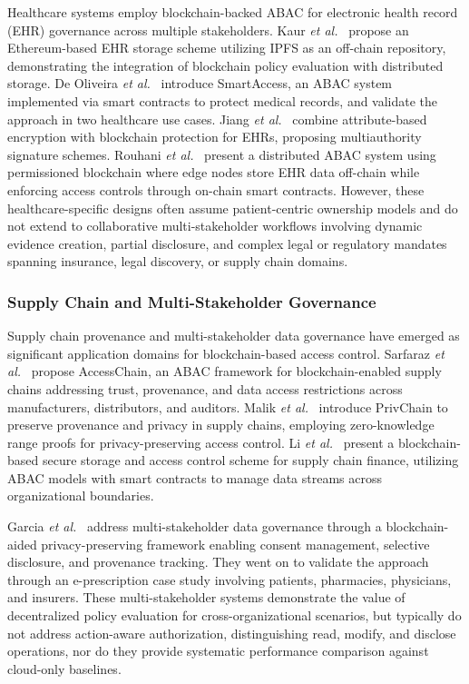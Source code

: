 \documentclass[pdflatex,sn-mathphys-num]{sn-jnl}
\begin{document}
Healthcare systems employ blockchain-backed ABAC for electronic health record (EHR) governance across multiple stakeholders. Kaur \emph{et al.}~\cite{kaur2024ehrabac} propose an Ethereum-based EHR storage scheme utilizing IPFS as an off-chain repository, demonstrating the integration of blockchain policy evaluation with distributed storage. De Oliveira \emph{et al.}~\cite{oliveira2022smartaccess} introduce SmartAccess, an ABAC system implemented via smart contracts to protect medical records, and validate the approach in two healthcare use cases. Jiang \emph{et al.}~\cite{jiang2022abeblockchain} combine attribute-based encryption with blockchain protection for EHRs, proposing multiauthority signature schemes. Rouhani \emph{et al.}~\cite{rouhani2021distributed} present a distributed ABAC system using permissioned blockchain where edge nodes store EHR data off-chain while enforcing access controls through on-chain smart contracts. However, these healthcare-specific designs often assume patient-centric ownership models and do not extend to collaborative multi-stakeholder workflows involving dynamic evidence creation, partial disclosure, and complex legal or regulatory mandates spanning insurance, legal discovery, or supply chain domains.

\subsubsection{Supply Chain and Multi-Stakeholder Governance}
Supply chain provenance and multi-stakeholder data governance have emerged as significant application domains for blockchain-based access control. Sarfaraz \emph{et al.}~\cite{sarfaraz2023accesschain} propose AccessChain, an ABAC framework for blockchain-enabled supply chains addressing trust, provenance, and data access restrictions across manufacturers, distributors, and auditors. Malik \emph{et al.}~\cite{malik2022privchain} introduce PrivChain to preserve provenance and privacy in supply chains, employing zero-knowledge range proofs for privacy-preserving access control. Li \emph{et al.}~\cite{li2022blockchainsupply} present a blockchain-based secure storage and access control scheme for supply chain finance, utilizing ABAC models with smart contracts to manage data streams across organizational boundaries.

Garcia \emph{et al.}~\cite{garcia2022blockchainmulti} address multi-stakeholder data governance through a blockchain-aided privacy-preserving framework enabling consent management, selective disclosure, and provenance tracking. They went on to validate the approach through an e-prescription case study involving patients, pharmacies, physicians, and insurers. These multi-stakeholder systems demonstrate the value of decentralized policy evaluation for cross-organizational scenarios, but typically do not address action-aware authorization, distinguishing read, modify, and disclose operations, nor do they provide systematic performance comparison against cloud-only baselines.
\end{document}
